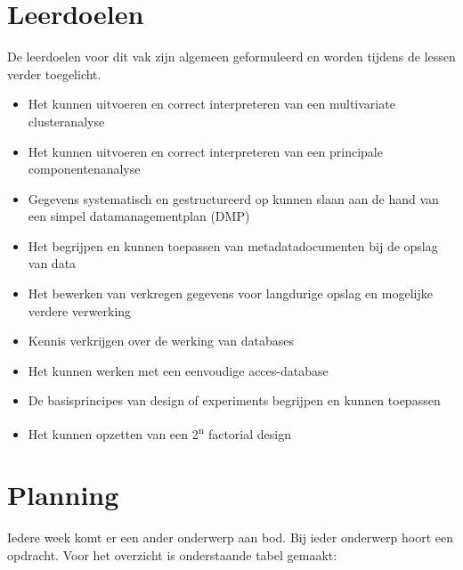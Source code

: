 \section{Leerdoelen}
De leerdoelen voor dit vak zijn algemeen geformuleerd en worden tijdens de lessen verder toegelicht.
\begin{itemize}
    \item Het kunnen uitvoeren en correct interpreteren van een multivariate clusteranalyse
    \item Het kunnen uitvoeren en correct interpreteren van een principale componentenanalyse
    \item Gegevens systematisch en gestructureerd op kunnen slaan aan de hand van een simpel datamanagementplan (DMP)
    \item Het begrijpen en kunnen toepassen van metadatadocumenten bij de opslag van data
    \item Het bewerken van verkregen gegevens voor langdurige opslag en mogelijke verdere verwerking
    \item Kennis verkrijgen over de werking van databases
    \item Het kunnen werken met een eenvoudige acces-database
    \item De basisprincipes van design of experiments begrijpen en kunnen toepassen
    \item Het kunnen opzetten van een 2\textsuperscript{n} factorial design

\end{itemize}

\section{Planning}

Iedere week komt er een ander onderwerp aan bod. Bij ieder onderwerp hoort een opdracht. Voor het overzicht is onderstaande tabel gemaakt:

